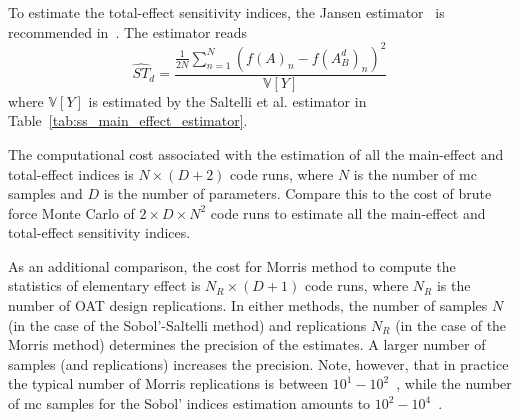 To estimate the total-effect sensitivity indices, the Jansen estimator~\cite{Jansen1999} is recommended in~\cite{Saltelli2010a}.
The estimator reads
\begin{equation}
  \widehat{ST}_d = \frac{\frac{1}{2N}\sum_{n=1}^{N}\left(f(A)_n - f(A_B^d)_n\right)^2}{\mathbb{V}[Y]}
\label{eq:ss_jansen_estimator}
\end{equation}
where $\mathbb{V}[Y]$ is estimated by the Saltelli et al. estimator in Table~\ref{tab:ss_main_effect_estimator}.

The computational cost associated with the estimation of all the main-effect and total-effect indices is $N \times (D + 2)$ code runs,
where $N$ is the number of \gls{mc} samples and $D$ is the number of parameters.
Compare this to the cost of brute force Monte Carlo of $2 \times D \times N^2$ code runs to estimate all the main-effect and total-effect sensitivity indices. 

As an additional comparison, the cost for Morris method to compute the statistics of elementary effect is $N_R \times (D + 1)$ code runs,
where $N_R$ is the number of OAT design replications.
In either methods, the number of samples $N$ (in the case of the Sobol'-Saltelli method) and replications $N_R$ (in the case of the Morris method)
determines the precision of the estimates.
A larger number of samples (and replications) increases the precision.
Note, however, that in practice the typical number of Morris replications is between $10^1 - 10^2$~\cite{Saltelli2010}, 
while the number of \gls{mc} samples for the Sobol' indices estimation amounts to $10^2 - 10^4$~\cite{Sobol2001}.

